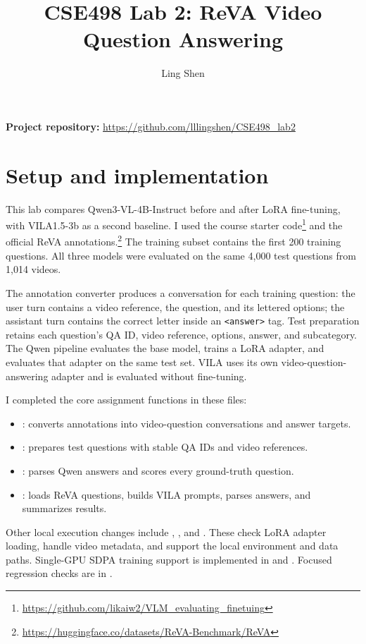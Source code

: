\documentclass[11pt]{article}
\title{CSE498 Lab 2: ReVA Video Question Answering}
\author{Ling Shen}
\date{}
\begin{document}
\maketitle
\noindent\textbf{Project repository:} \url{https://github.com/lllingshen/CSE498_lab2}

\section{Setup and implementation}

This lab compares Qwen3-VL-4B-Instruct before and after LoRA fine-tuning,
with VILA1.5-3b as a second baseline. I used the course starter code\footnote{\url{https://github.com/likaiw2/VLM_evaluating_finetuing}}
and the official ReVA annotations.\footnote{\url{https://huggingface.co/datasets/ReVA-Benchmark/ReVA}}
The training subset contains the first 200 training questions. All three
models were evaluated on the same 4,000 test questions from 1,014 videos.

The annotation converter produces a conversation for each training question:
the user turn contains a video reference, the question, and its lettered
options; the assistant turn contains the correct letter inside an
\texttt{<answer>} tag. Test preparation retains each question's QA ID,
video reference, options, answer, and subcategory. The Qwen pipeline evaluates
the base model, trains a LoRA adapter, and evaluates that adapter on the same
test set. VILA uses its own video-question-answering adapter and is evaluated
without fine-tuning.

I completed the core assignment functions in these files:
\begin{itemize}
\setlength{\itemsep}{0pt}
\item {}: converts annotations into
video-question conversations and answer targets.
\item {}: prepares
test questions with stable QA IDs and video references.
\item {}: parses Qwen answers and
scores every ground-truth question.
\item {}: loads ReVA questions, builds VILA
prompts, parses answers, and summarizes results.
\end{itemize}
Other local execution changes include
,
, and
. These check LoRA adapter loading,
handle video metadata, and support the local environment and data paths.
Single-GPU SDPA training support is implemented in
 and
.
Focused regression checks are in .
\end{document}
